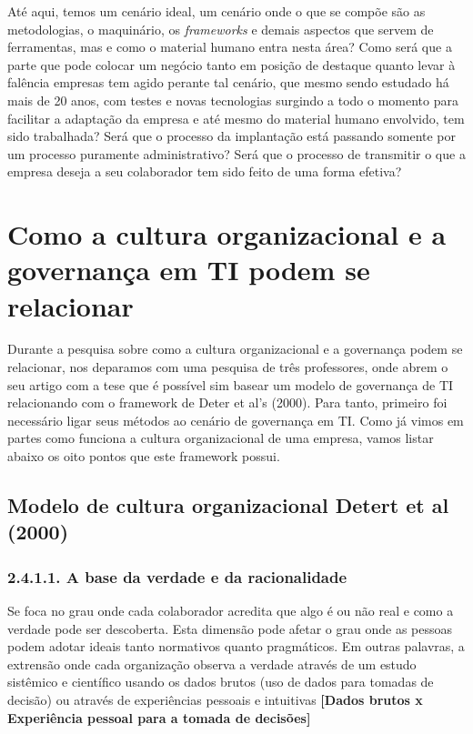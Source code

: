 Até aqui, temos um cenário ideal, um cenário onde o que se compõe são as metodologias, o maquinário, os {\it frameworks} e demais aspectos que servem de ferramentas, mas e como o material humano entra nesta área? Como será que a parte que pode colocar um negócio tanto em posição de destaque quanto levar à falência empresas tem agido perante tal cenário, que mesmo sendo estudado há mais de 20 anos, com testes e novas tecnologias surgindo a todo o momento para facilitar a adaptação da empresa e até mesmo do material humano envolvido, tem sido trabalhada? Será que o processo da implantação está passando somente por um processo puramente administrativo? Será que o processo de transmitir o que a empresa deseja a seu colaborador tem sido feito de uma forma efetiva? 

\section{Como a cultura organizacional e a governança em TI podem se relacionar}

Durante a pesquisa sobre como a cultura organizacional e a governança podem se relacionar, nos deparamos com uma pesquisa de três professores, onde abrem o seu artigo com a tese que é possível sim basear um modelo de governança de TI relacionando com o framework de Deter et al's (2000). Para tanto, primeiro foi necessário ligar seus métodos ao cenário de governança em TI. Como já vimos em partes como funciona a cultura organizacional de uma empresa, vamos listar abaixo os oito pontos que este framework possui.\cite{exploringit}

\subsection{Modelo de cultura organizacional Detert et al (2000)}
    \subsubsection{2.4.1.1. A base da verdade e da racionalidade}
    Se foca no grau onde cada colaborador acredita que algo é ou não real e como a verdade pode ser descoberta. Esta dimensão pode afetar o grau onde as pessoas podem adotar ideais tanto normativos quanto pragmáticos. Em outras palavras, a extrensão onde cada organização observa a verdade através de um estudo sistêmico e científico usando os dados brutos (uso de dados para tomadas de decisão) ou através de experiências pessoais e intuitivas {\bf [Dados brutos x Experiência pessoal para a tomada de decisões]}
    
